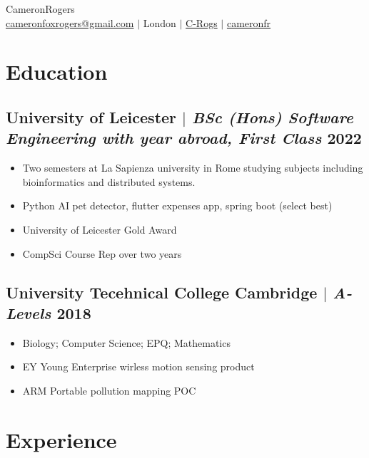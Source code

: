 \documentclass[10pt]{article}
\begin{document}
\begin{center}
    {\fontsize{32}{32}\selectfont\interthin Cameron\interheavy Rogers} \\ \bigskip
    {\color{icnclr}\faEnvelope[regular]} \href{mailto:hi@example.com}{cameronfoxrogers@gmail.com} $|$ 
    {\color{icnclr}} {London} $|$
    {\color{icnclr}} \href{https://github.com/C-Rogs}{C-Rogs} $|$
    {\color{icnclr}\faLinkedinIn} \href{https://www.linkedin.com/in/cameronfr}{cameronfr}
\end{center}

\section{Education}
\subsection{University of Leicester $|$ {\small\normalfont\textit{BSc (Hons) Software Engineering with year abroad, First Class}} \small\hfill 2022}
\begin{itemize}
    \item Two semesters at La Sapienza university in Rome studying subjects including bioinformatics and distributed systems.
    \item Python AI pet detector, flutter expenses app, spring boot (select best) 
    \item University of Leicester Gold Award 
    \item CompSci Course Rep over two years
\end{itemize}

\subsection{University Tecehnical College Cambridge $|$ {\small\normalfont\textit{A-Levels}} \small\hfill 2018}
\begin{itemize}
    \item Biology; Computer Science; EPQ; Mathematics 
    \item EY Young Enterprise wirless motion sensing product 
    \item ARM Portable pollution mapping POC
\end{itemize}

\section{Experience}
\end{document}
